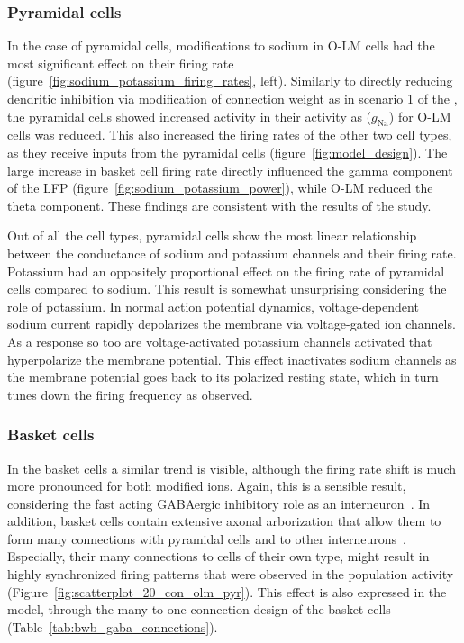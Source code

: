 \subsubsection{Pyramidal cells}
In the case of pyramidal cells, modifications to sodium in O-LM cells had the most 
significant effect on their firing rate (figure~\ref{fig:sodium_potassium_firing_rates}, left). Similarly to directly 
reducing dendritic inhibition via modification of connection weight as in scenario 1 of the \textcite{sanjayImpairedDendriticInhibition2015},
the pyramidal cells showed increased activity in their activity as (\(g_{\text{Na}}\)) for O-LM cells was reduced. 
This also increased the firing rates of the other two cell types, as they receive inputs from the 
pyramidal cells (figure~\ref{fig:model_design}). The large increase in basket cell firing rate directly influenced
the gamma component of the LFP (figure~\ref{fig:sodium_potassium_power}), while O-LM reduced the theta component.
These findings are consistent with the results of the \textcite{sanjayImpairedDendriticInhibition2015} study.

Out of all the cell types, pyramidal cells show the most linear relationship between the conductance of sodium 
and potassium channels and their firing rate. Potassium had an oppositely proportional effect on the firing rate of 
pyramidal cells compared to sodium. This result is somewhat unsurprising considering the role of potassium. In normal action potential
dynamics, voltage-dependent sodium current rapidly depolarizes the membrane via voltage-gated ion channels. As a response so too are
voltage-activated potassium channels activated that hyperpolarize the membrane potential. This effect inactivates sodium channels
as the membrane potential goes back to its polarized resting state, which in turn tunes down the firing frequency as observed. 

\subsubsection{Basket cells}
In the basket cells a similar trend is visible, although the firing rate shift is much more pronounced for both modified ions.
Again, this is a sensible result, considering the fast acting GABAergic inhibitory role as an interneuron~\parencite{wangGammaOscillationSynaptic1996}. 
In addition, basket cells contain extensive axonal arborization that allow them to form many connections with pyramidal cells and 
to other interneurons~\parencite{tukkerDistinctDendriticArborization2013}. Especially, their many connections to cells of their own type,
might result in highly synchronized firing patterns that were observed in the population activity (Figure~\ref{fig:scatterplot_20_con_olm_pyr}).
This effect is also expressed in the model, through the many-to-one connection design of the basket cells (Table~\ref{tab:bwb_gaba_connections}).

